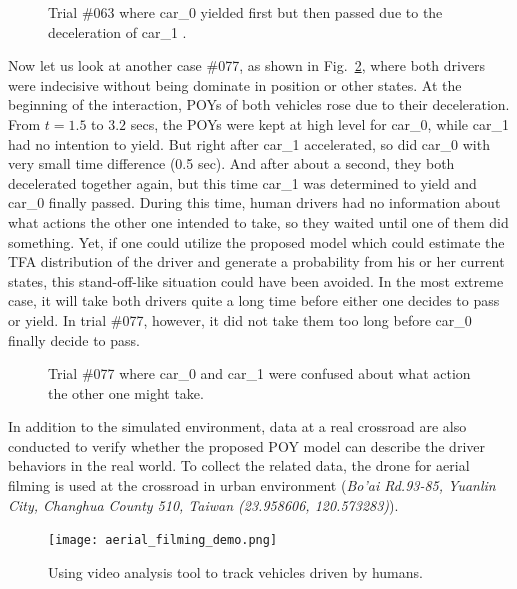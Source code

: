 \begin{figure}[htbp!]
\begin{center}
\end{center}
\caption{Trial \#063 where car\_0 yielded first but then passed due to the deceleration of car\_1 .}
\label{fig:trial063} 
\end{figure}

Now let us look at another case \#077, as shown in Fig.~\ref{fig:trial077}, where both drivers were indecisive without being dominate in position or other states. At the beginning of the interaction, POYs of both vehicles rose due to their deceleration. From $t=1.5$ to $3.2$ secs, the POYs were kept at high level for car\_0, while car\_1 had no intention to yield. But right after car\_1 accelerated, so did car\_0 with very small time difference (0.5 sec). And after about a second, they both decelerated together again, but this time car\_1 was determined to yield and car\_0 finally passed. During this time, human drivers had no information about what actions the other one intended to take, so they waited until one of them did something. Yet, if one could utilize the proposed model which could estimate the TFA distribution of the driver and generate a probability from his or her current states, this stand-off-like situation could have been avoided. In the most extreme case, it will take both drivers quite a long time before either one decides to pass or yield. In trial \#077, however, it did not take them too long before car\_0 finally decide to pass.  

\begin{figure}[htbp!]
\begin{center}
\end{center}
\caption{Trial \#077 where car\_0 and car\_1 were confused about what action the other one might take.}
\label{fig:trial077} 
\end{figure}

\newpage

In addition to the simulated environment, data at a real crossroad are also conducted to verify whether the proposed POY model can describe the driver behaviors in the real world. To collect the related data, the drone for aerial filming is used at the crossroad in urban environment (\textit{Bo’ai Rd.93-85, Yuanlin City, Changhua County 510, Taiwan (23.958606, 120.573283)}).

\begin{figure}[htbp!]
\begin{center}
\texttt{[image: aerial\_filming\_demo.png]}
\end{center}
\caption{Using video analysis tool to track vehicles driven by humans.}
\label{aerial_filming} 
\end{figure}


